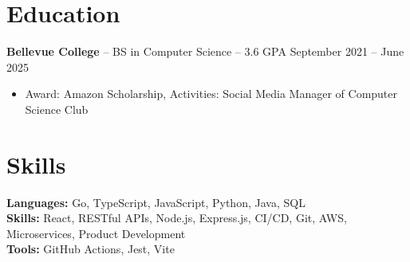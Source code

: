 \documentclass[11pt]{article}       %
\begin{document}

\vspace{-18.5pt}

\section*{Education}
\textbf{Bellevue College} -- BS in Computer Science -- 3.6 GPA \hfill September 2021 -- June 2025\\
\vspace{-9pt}
\begin{itemize}
  \item Award: Amazon Scholarship, Activities: Social Media Manager of Computer Science Club
\end{itemize}

\vspace{-18.5pt}

\section*{Skills}
\textbf{Languages:} Go, TypeScript, JavaScript, Python, Java, SQL\\
\textbf{Skills:} React, RESTful APIs, Node.js, Express.js, CI/CD, Git, AWS, Microservices, Product Development\\
\textbf{Tools:} GitHub Actions, Jest, Vite

\vspace{-6.5pt}
\end{document}
